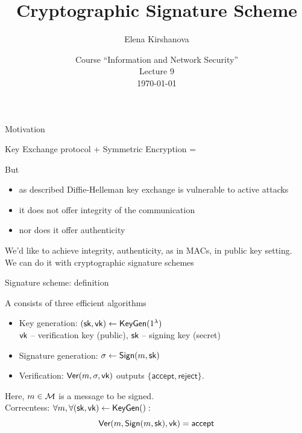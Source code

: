 \documentclass[usenames,dvipsnames, 9pt]{beamer}
\author{Elena Kirshanova \\ [10pt]
}
\title{\Huge Cryptographic Signature Scheme}
\date{ Course ``Information and Network Security'' \\ 	
	Lecture 9 \\ \today }
\begin{document}
	
\begin{frame}
	\titlepage
\end{frame}

\begin{frame}{Motivation}
	\large 
	\begin{center}
Key Exchange protocol  + Symmetric Encryption =  {\color{Orange}{confidentiality} } 
	\end{center}
But
	\begin{itemize}
		\itemsep 10pt
		\item as described Diffie-Helleman key exchange is {\color{Orange} vulnerable to active attacks} 
		\item  it does not offer {\color{Orange} integrity} of the communication 
		\item nor does it offer {\color{Orange} authenticity}
	\end{itemize}

\vspace{15pt}
\centering
We'd like to achieve integrity, authenticity, as in MACs, in {\color{Orange} public} key setting.\\[10pt]
\pause
\Large We can do it with {\color{Orange} cryptographic signature schemes}
\end{frame}



\begin{frame}{Signature scheme: definition}
\Large

A {\color{Orange}{Signature Scheme}} consists of three efficient algorithms
\begin{itemize}
	\itemsep 10pt
	\item Key generation: $(\textsf{sk}, \textsf{vk}) \leftarrow \textsf{KeyGen}(1^\lambda)$ \\
	$\textsf{vk}$ -- verification key (public), $\textsf{sk}$ -- signing key (secret)
	\item Signature generation: $\sigma \leftarrow \textsf{Sign}(m, \textsf{sk})$
	\item Verification: $\textsf{Ver}(m, \sigma, \textsf{vk})$ outputs $\{\mathsf{accept}, \mathsf{reject}  \}$.
\end{itemize}
\vspace{15pt}
Here,  $m \in \mathcal{M}$ is a message to be signed.\\[10pt]
\pause
{\color{Orange}Correcntess}: $\forall m, \forall (\textsf{sk}, \textsf{vk}) \leftarrow \textsf{KeyGen}():$ 
\[
	\textsf{Ver}(m, \textsf{Sign}(m, \textsf{sk}), \textsf{vk})  = \mathsf{accept}
\]
\end{frame}
\end{document}
